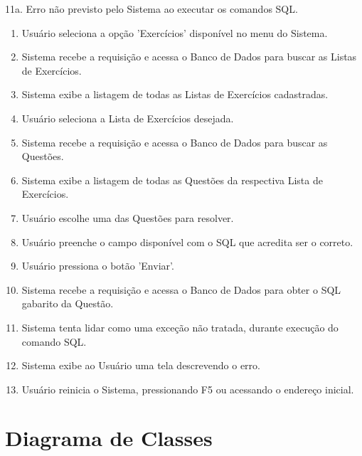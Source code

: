 \documentclass[graduacao,brazil]{ThesisPUC}
\begin{document}
11a. Erro n\~{a}o previsto pelo Sistema ao executar os comandos SQL.

\begin{enumerate}
  \item Usu\'{a}rio seleciona a opção 'Exerc\'{i}cios' dispon\'{i}vel no menu do Sistema.
  \item Sistema recebe a requisi\c{c}\~{a}o e acessa o Banco de Dados para buscar as Listas de Exerc\'{i}cios.
  \item Sistema exibe a listagem de todas as Listas de Exerc\'{i}cios cadastradas.
  \item Usu\'{a}rio seleciona a Lista de Exerc\'{i}cios desejada.
  \item Sistema recebe a requisi\c{c}\~{a}o e acessa o Banco de Dados para buscar as Quest\~{o}es.
  \item Sistema exibe a listagem de todas as Quest\~{o}es da respectiva Lista de Exerc\'{i}cios.
  \item Usu\'{a}rio escolhe uma das Quest\~{o}es para resolver.
  \item Usu\'{a}rio preenche o campo dispon\'{i}vel com o SQL que acredita ser o correto.
  \item Usu\'{a}rio pressiona o bot\~{a}o 'Enviar'.
  \item Sistema recebe a requisi\c{c}\~{a}o e acessa o Banco de Dados para obter o SQL gabarito da Quest\~{a}o.
  \item Sistema tenta lidar como uma exce\c{c}\~{a}o n\~{a}o tratada, durante execu\c{c}\~{a}o do comando SQL.
  \item Sistema exibe ao Usu\'{a}rio uma tela descrevendo o erro.
  \item Usu\'{a}rio reinicia o Sistema, pressionando F5 ou acessando o endere\c{c}o inicial.
\end{enumerate}



\section{Diagrama de Classes}

\end{document}
